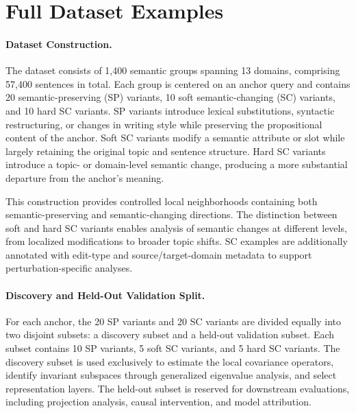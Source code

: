 



\section{Full Dataset Examples}
\label{app:expanded_data}

\paragraph{Dataset Construction.}
The dataset consists of 1,400 semantic groups spanning 13 domains, comprising 57,400 sentences in total. Each group is centered on an anchor query and contains 20 semantic-preserving (SP) variants, 10 soft semantic-changing (SC) variants, and 10 hard SC variants. SP variants introduce lexical substitutions, syntactic restructuring, or changes in writing style while preserving the propositional content of the anchor. Soft SC variants modify a semantic attribute or slot while largely retaining the original topic and sentence structure. Hard SC variants introduce a topic- or domain-level semantic change, producing a more substantial departure from the anchor's meaning.

This construction provides controlled local neighborhoods containing both semantic-preserving and semantic-changing directions. The distinction between soft and hard SC variants enables analysis of semantic changes at different levels, from localized modifications to broader topic shifts. SC examples are additionally annotated with edit-type and source/target-domain metadata to support perturbation-specific analyses.

\paragraph{Discovery and Held-Out Validation Split.}
For each anchor, the 20 SP variants and 20 SC variants are divided equally into two disjoint subsets: a discovery subset and a held-out validation subset. Each subset contains 10 SP variants, 5 soft SC variants, and 5 hard SC variants. The discovery subset is used exclusively to estimate the local covariance operators, identify invariant subspaces through generalized eigenvalue analysis, and select representation layers. The held-out subset is reserved for downstream evaluations, including projection analysis, causal intervention, and model attribution.

